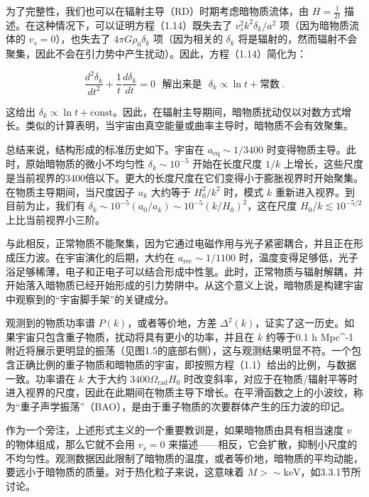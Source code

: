 为了完整性，我们也可以在辐射主导（RD）时期考虑暗物质流体，由 \( H = \frac{1}{2t} \) 描述。在这种情况下，可以证明方程（1.14）既失去了 \( v_s^2 k^2 \delta_k/a^2 \) 项（因为暗物质流体的 \( v_s = 0 \)），也失去了 \( 4\pi G \rho_0 \delta_k \) 项（因为相关的 \( \delta_k \) 将是辐射的，然而辐射不会聚集，因此不会在引力势中产生扰动）。因此，方程（1.14）简化为：

\[ \frac{d^2 \delta_k}{dt^2} + \frac{1}{t} \frac{d \delta_k}{dt} = 0 \,\,\,\,\text{解出来是} \,\,\,\,\delta_k \propto \ln t+\text{常数}  ~. \]

这给出 \( \delta_k \propto \ln t + \text{const} \)。因此，在辐射主导期间，暗物质扰动仅以对数方式增长。类似的计算表明，当宇宙由真空能量或曲率主导时，暗物质不会有效聚集。

总结来说，结构形成的标准历史如下。宇宙在 \( a_{\text{eq}} \sim 1/3400 \) 时变得物质主导。此时，原始暗物质的微小不均匀性 \( \delta_k \sim 10^{-5} \) 开始在长度尺度 \( 1/k \) 上增长，这些尺度是当前视界的3400倍以下。更大的长度尺度在它们变得小于膨胀视界时开始聚集。在物质主导期间，当尺度因子 \( a_k \) 大约等于 \( H_0^2 / k^2 \) 时，模式 \( k \) 重新进入视界。到目前为止，我们有 \( \delta_k \sim 10^{-5}(a_0/a_k) \sim 10^{-5}(k/H_0)^2 \)，这在尺度 \( H_0/k \lesssim 10^{-5/2} \) 上比当前视界小三阶。

与此相反，正常物质不能聚集，因为它通过电磁作用与光子紧密耦合，并且正在形成压力波。在宇宙演化的后期，大约在 \( a_{\text{rec}} \sim 1/1100 \) 时，温度变得足够低，光子浴足够稀薄，电子和正电子可以结合形成中性氢。此时，正常物质与辐射解耦，并开始落入暗物质已经开始形成的引力势阱中。从这个意义上说，暗物质是构建宇宙中观察到的“宇宙脚手架”的关键成分。

观测到的物质功率谱 \( P(k) \)，或者等价地，方差 \( \Delta^2(k) \)，证实了这一历史。如果宇宙只包含重子物质，扰动将具有更小的功率，并且在 \( k \) 约等于0.1 h Mpc^-1 附近将展示更明显的振荡（见图1.5的底部右侧），这与观测结果明显不符。一个包含正确比例的重子物质和暗物质的宇宙，即按照方程（1.1）给出的比例，与数据一致。功率谱在 \( k \) 大于大约 \( 3400 \Omega_{\text{rad}} H_0 \) 时改变斜率，对应于在物质/辐射平等时进入视界的尺度，因此在此期间在物质主导下增长。在平滑函数之上的小波纹，称为“重子声学振荡”（BAO），是由于重子物质的次要群体产生的压力波的印记。

作为一个旁注，上述形式主义的一个重要教训是，如果暗物质由具有相当速度 \( v \) 的物体组成，那么它就不会用 \( v_s = 0 \) 来描述——相反，它会扩散，抑制小尺度的不均匀性。观测数据因此限制了暗物质的温度，或者等价地，暗物质的平均动能，要远小于暗物质的质量。对于热化粒子来说，这意味着 \( M > \sim \text{keV} \)，如3.3.1节所讨论。









 

